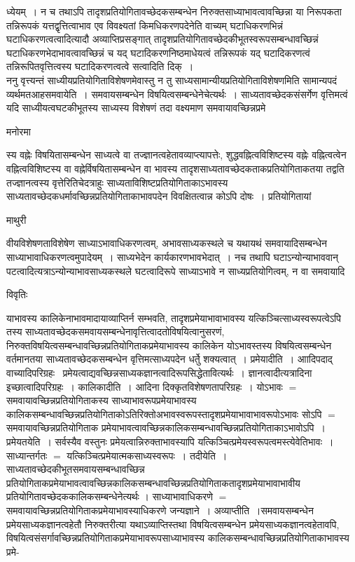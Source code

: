 \documentclass[10pt, openany]{book}
\begin{document}
{ध्येयम्~। न च तथाऽपि तादृशप्रतियोगितावच्छेदकसम्बन्धेन निरुक्तसाध्याभावत्वावच्छिन्ना या निरूपकता तन्निरूपकं यत्तद्वृत्तित्वाभाव एव विवक्ष्यतां किमधिकरणपदेनेति वाच्यम् घटाधिकरणभिन्नं घटाधिकरणत्वत्वादित्यादौ अव्याप्तिप्रसङ्गात् तादृशप्रतियोगितावच्छेदकीभूतस्वरूपसम्बन्धावच्छिन्नं घटाधिकरणभेदाभावत्वावच्छिन्नं च यद् घटादिकरणनिष्ठमाधेयत्वं तन्निरूपकं यद् घटादिकरणत्वं तन्निरूपितवृत्तित्वस्य घटादिकरणत्वत्वे सत्वादिति दिक्~।\\

ननु वृत्त्यन्तं साध्यीयप्रतियोगिताविशेषणमेवास्तु न तु साध्यसामान्यीयप्रतियोगिताविशेषणमिति सामान्यपदं व्यर्थमतआह\textendash  समवायेति~। समवायसम्बन्धेन विषयित्वसम्बन्धेनेचेत्यर्थः~। साध्यतावच्छेदकसंसर्गेण वृत्तिमत्वं यदि साध्यीयत्वघटकीभूतस्य साध्यस्य विशेषणं तदा वक्ष्यमाण समवायावच्छिन्नप्रमे
\begin{center}   मनोरमा  \end{center}
स्य वह्नेः विषयितासम्बन्धेन साध्यत्वे वा तज्ज्ञानत्वहेतावव्याप्त्यापत्तेः, शुद्धवह्नित्वविशिष्टस्य वह्नेः वह्नित्वत्वेन वह्नित्वविशिष्टस्य वा वह्नेर्विषयितासम्बन्धेन वा भावस्य
तादृशसाध्यतावच्छेदकताकप्रतियोगिताकतया तद्वति तज्ज्ञानत्वस्य वृत्तेरितिचेदत्राहुः साध्यताविशिष्टप्रतियोगिताकाऽभावस्य साध्यतावच्छेदकधर्मावच्छिन्नप्रतियोगिताकाभावपदेन विवक्षितत्वान्न कोऽपि दोषः~। प्रतियोगितायां
\newpage
\begin{center}  माथुरी  \end{center}
{\la वीयविशेषणताविशेषेण साध्याऽभावाधिकरणत्वम्, अभावसाध्यकस्थले च यथायथं समवायादिसम्बन्धेन साध्याभावाधिकरणत्वमुपादेयम्~। साध्यभेदेन कार्यकारणभावभेदात्~। नच तथापि घटाऽन्योन्याभाववान् पटत्वादित्यत्राऽन्योन्याभावसाध्यकस्थले घटत्वादिरूपे साध्याऽभावे न साध्यप्रतियोगित्वम्, न वा समवायादि}
\begin{center}     विवृतिः \end{center}

याभावस्य कालिकेनाभावमादायाव्याप्तिर्न सम्भवति, तादृशप्रमेयाभावाभावस्य यत्किञ्चित्साध्यस्वरूपत्वेऽपि तस्य साध्यतावच्छेदकसमवायसम्बन्धेनावृत्तित्वादतोविषयित्वानुसरणं, निरुक्तविषयित्वसम्बन्धावच्छिन्नप्रतियोगिताकप्रमेयाभावस्य कालिकेन योऽभावस्तस्य विषयित्वसम्बन्धेन वर्तमानतया साध्यतावच्छेदकसम्बन्धेन वृत्तिमत्साध्यपदेन धर्तेु    शक्यत्वात्~। प्रमेयादीति~। आादिपदाद् वाच्यादिपरिग्रहः~ प्रमेयत्वाद्यवच्छिन्नसाध्यकज्ञानत्वादिरूपसिद्धेतावित्यर्थः~। ज्ञानत्वादीत्यत्रादिना इच्छात्वादिपरिग्रहः~। कालिकादीति~। आदिना
दिक्कृतविशेषणतापरिग्रहः~। योऽभावः $=$ समवायावच्छिन्नप्रतियोगिताकस्य साध्याभावरूपप्रमेयाभावस्य कालिकसम्बन्धावच्छिन्नप्रतियोगिताकोऽतिरिक्तोअभावस्वरूपस्तादृशप्रमेयाभावाभावरूपोऽभावः सोऽपि $=$ समवायावच्छिन्नप्रतियोगिताक प्रमेयाभावत्वावच्छिन्नकालिकसम्बन्धावच्छिन्नप्रतियोगिताकाऽभावोऽपि~। प्रमेयतयेति~। सर्वस्यैव वस्तुनः प्रमेयत्वान्निरुक्ताभावस्यापि
यत्किञ्चित्प्रमेयस्वरूपत्वमस्त्येवेतिभावः~। साध्यान्तर्गतः $=$ यत्किञ्चित्प्रमेयात्मकसाध्यस्वरूपः~। तदीयेति~। साध्यतावच्छेदकीभूतसमवायसम्बन्धावच्छिन्न प्रतियोगिताकप्रमेयाभावत्वावच्छिन्नकालिकसम्बन्धावच्छिन्नप्रतियोगिताकतादृशप्रमेयाभावाभावीय प्रतियोगितावच्छेदककालिकसम्बन्धेनेत्यर्थः । साध्याभावाधिकरणे $=$ समवायावच्छिन्नप्रतियोगिताकप्रमेयाभावस्याधिकरणे जन्यज्ञाने~। अव्याप्तीति~।समवायसम्बन्धेन प्रमेयसाध्यकज्ञानत्वहेतौ निरुक्तरीत्या यथाऽव्याप्तिस्तथा विषयित्वसम्बन्धेन प्रमेयसाध्यकज्ञानत्वहेतावपि, विषयित्वसंसर्गावच्छिन्नप्रतियोगिताकप्रमेयाभावरूपसाध्याभावस्य कालिकसम्बन्धावच्छिन्नप्रतियोगिताकाभावस्य प्रमे-

}
\end{document}
